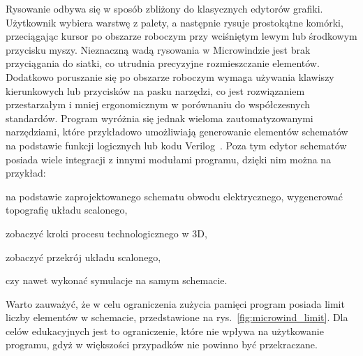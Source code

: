 \indent Rysowanie odbywa się w sposób zbliżony do klasycznych edytorów grafiki.
Użytkownik wybiera warstwę z palety,
a następnie rysuje prostokątne komórki,
przeciągając kursor po obszarze roboczym przy wciśniętym lewym lub środkowym przycisku myszy. 
Nieznaczną wadą rysowania w Microwindzie jest brak przyciągania do siatki,
co utrudnia precyzyjne rozmieszczanie elementów.
Dodatkowo poruszanie się po obszarze roboczym wymaga używania klawiszy kierunkowych lub przycisków na pasku narzędzi,
co jest rozwiązaniem przestarzałym i mniej ergonomicznym w porównaniu do współczesnych standardów.
Program wyróżnia się jednak wieloma zautomatyzowanymi narzędziami,
które przykładowo umożliwiają generowanie elementów schematów na podstawie funkcji logicznych lub kodu Verilog~\cite{microwind_operation_commands}. 
Poza tym edytor schematów posiada wiele integracji z innymi modułami programu,
dzięki nim można na przykład:
\begin{citemize}
    \item na podstawie zaprojektowanego schematu obwodu elektrycznego, wygenerować topografię układu scalonego,
    \item zobaczyć kroki procesu technologicznego w 3D,
    \item zobaczyć przekrój układu scalonego,
    \item czy nawet wykonać symulacje na samym schemacie.
\end{citemize}
Warto zauważyć, że w celu ograniczenia zużycia pamięci program posiada limit liczby elementów w schemacie,
przedstawione na rys.~\ref{fig:microwind_limit}.
Dla celów edukacyjnych jest to ograniczenie, które nie wpływa na użytkowanie programu,
gdyż w większości przypadków nie powinno być przekraczane.


